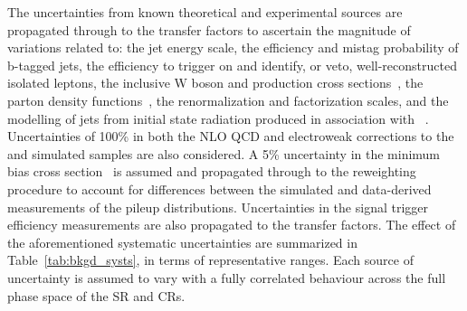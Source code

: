 The uncertainties from known theoretical and experimental sources are
propagated through to the transfer factors to ascertain the magnitude
of variations related to: the jet energy scale, the efficiency and
mistag probability of b-tagged jets, the efficiency to trigger on and
identify, or veto, well-reconstructed isolated leptons, the inclusive
W boson and \ttbar production cross sections~\cite{}, the parton
density functions~\cite{}, the renormalization and factorization
scales, and the modelling of jets from initial state radiation
produced in association with \ttbar~\cite{}. Uncertainties of 100\% in
both the NLO QCD and electroweak corrections to the \wj and \zj
simulated samples are also considered. A 5\% uncertainty in the
minimum bias cross section~\cite{} is assumed and propagated through
to the reweighting procedure to account for differences between the
simulated and data-derived measurements of the pileup
distributions. Uncertainties in the signal trigger efficiency
measurements are also propagated to the transfer factors. The effect
of the aforementioned systematic uncertainties are summarized in
Table~\ref{tab:bkgd_systs}, in terms of representative ranges.  Each
source of uncertainty is assumed to vary with a fully correlated
behaviour across the full phase space of the SR and CRs.

